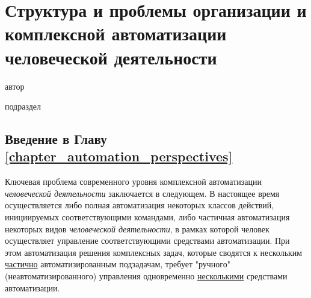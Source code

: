 \chapter{Структура и проблемы организации и комплексной автоматизации человеческой деятельности}
\label{chapter_automation_perspectives}

\vspace{-7\baselineskip}

\begin{SCn}
\begin{scnrelfromlist}{автор}
\end{scnrelfromlist}

\bigskip


\bigskip

\begin{scnrelfromlist}{подраздел}
\end{scnrelfromlist}


\end{SCn}

\section*{Введение в Главу \ref{chapter_automation_perspectives}}
Ключевая проблема современного уровня комплексной автоматизации \textit{человеческой деятельности} заключается в следующем. В настоящее время осуществляется либо полная автоматизация некоторых классов действий, инициируемых соответствующими командами, либо частичная автоматизация некоторых видов \textit{человеческой деятельности}, в рамках которой человек осуществляет управление соответствующими средствами автоматизации. При этом автоматизация решения комплексных задач, которые сводятся к нескольким \underline{частично} автоматизированным подзадачам, требует "ручного"{} (неавтоматизированного) управления одновременно \underline{несколькими} средствами автоматизации.

